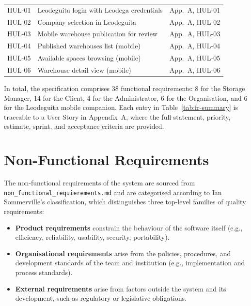 \documentclass[11pt,a4paper,oneside]{report}
\begin{document}
\begin{longtable}{>{\raggedright\arraybackslash}p{2.0cm} p{9.2cm} >{\raggedright\arraybackslash}p{3.4cm}}
    \multicolumn{3}{l}{\textit{Leodeguita mobile companion (HUL)}} \\
    \midrule
    HUL-01 & Leodeguita login with Leodega credentials & App.~A, HUL-01 \\
    HUL-02 & Company selection in Leodeguita & App.~A, HUL-02 \\
    HUL-03 & Mobile warehouse publication for review & App.~A, HUL-03 \\
    HUL-04 & Published warehouses list (mobile) & App.~A, HUL-04 \\
    HUL-05 & Available spaces browsing (mobile) & App.~A, HUL-05 \\
    HUL-06 & Warehouse detail view (mobile) & App.~A, HUL-06 \\
\end{longtable}

In total, the specification comprises 38 functional requirements: 8 for the Storage Manager, 14 for the Client, 4 for the Administrator, 6 for the Organisation, and 6 for the Leodeguita mobile companion. Each entry in Table~\ref{tab:fr-summary} is traceable to a User Story in Appendix~A, where the full statement, priority, estimate, sprint, and acceptance criteria are provided.

\section{Non-Functional Requirements}
\label{sec:non-functional-requirements-summary}

The non-functional requirements of the system are sourced from \texttt{non\_\allowbreak functional\_\allowbreak requierements.md} and are categorised according to Ian Sommerville's classification, which distinguishes three top-level families of quality requirements:

\begin{itemize}
    \item \textbf{Product requirements} constrain the behaviour of the software itself (e.g., efficiency, reliability, usability, security, portability).
    \item \textbf{Organisational requirements} arise from the policies, procedures, and development standards of the team and institution (e.g., implementation and process standards).
    \item \textbf{External requirements} arise from factors outside the system and its development, such as regulatory or legislative obligations.
\end{itemize}
\end{document}
